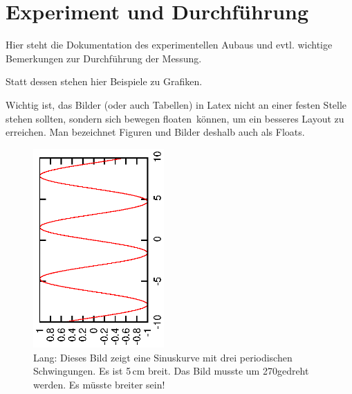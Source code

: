 \section{Experiment und Durchf\"uhrung}
Hier steht die Dokumentation des experimentellen Aubaus und evtl. wichtige 
Bemerkungen zur Durchf\"uhrung der Messung.

Statt dessen stehen hier Beispiele zu Grafiken.

Wichtig ist, das Bilder (oder auch Tabellen) in Latex nicht an einer festen Stelle stehen sollten, sondern sich bewegen \glqq floaten\grqq\ können, um
ein besseres Layout zu erreichen. Man bezeichnet Figuren und Bilder deshalb auch als Floats.

\begin{figure}[tbp]
 \centering
 \includegraphics[angle=270, width=5cm]{sinus} 
 \caption[Kurz: Eine Sinuskurve]
 {Lang: Dieses Bild zeigt eine Sinuskurve mit 
drei periodischen Schwingungen. Es ist 5\,cm breit. Das Bild musste um 
270\textdegree  gedreht werden. Es müsste breiter sein!}
\label{fig:sinus}
\end{figure}

